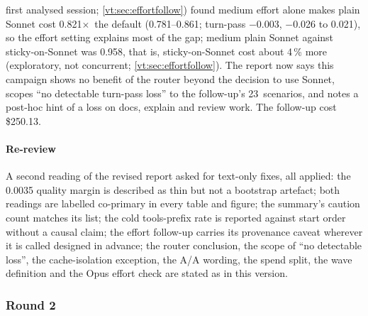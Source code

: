 \documentclass[11pt,letterpaper]{article}
\newcommand{\X}{\ensuremath{\times}}
\newcommand{\EcCI}{0.781--0.861}
\newcommand{\EcQual}{$-$0.003}
\newcommand{\EcQualCI}{$-$0.026 to 0.021}
\newcommand{\EcRatio}{0.821}
\newcommand{\EcScen}{23}
\newcommand{\EcSecGapPct}{4}
\newcommand{\EcSecRatio}{0.958}
\newcommand{\EcSpend}{250.13}
\begin{document}
\begin{enumerate}[leftmargin=1.6em]
    first analysed session; \cref{vt:sec:effortfollow}) found medium effort alone makes
    plain Sonnet cost \EcRatio\X\ the default (\EcCI; turn-pass \EcQual, \EcQualCI), so the effort setting explains
    most of the gap; medium plain Sonnet against sticky-on-Sonnet was \EcSecRatio, that is, sticky-on-Sonnet cost
    about \EcSecGapPct\,\% more (exploratory, not concurrent; \cref{vt:sec:effortfollow}). The report now says this
    campaign shows no benefit of the router beyond the decision to use Sonnet, scopes ``no detectable turn-pass
    loss'' to the follow-up's \EcScen\ scenarios, and notes a post-hoc hint of a loss on docs, explain and review work.
    The follow-up cost \$\EcSpend.
\end{enumerate}

\paragraph{Re-review} A second reading of the revised report asked for text-only fixes, all applied: the 0.0035
quality margin is described as thin but not a bootstrap artefact; both readings are labelled co-primary in every table
and figure; the summary's caution count matches its list; the cold tools-prefix rate is reported against start order
without a causal claim; the effort follow-up carries its provenance caveat wherever it is called designed in advance;
the router conclusion, the scope of ``no detectable loss'', the cache-isolation exception, the A/A wording, the
spend split, the wave definition and the Opus effort check are stated as in this version.

\subsubsection*{Round 2}\label{vt:app:round2}
\end{document}
